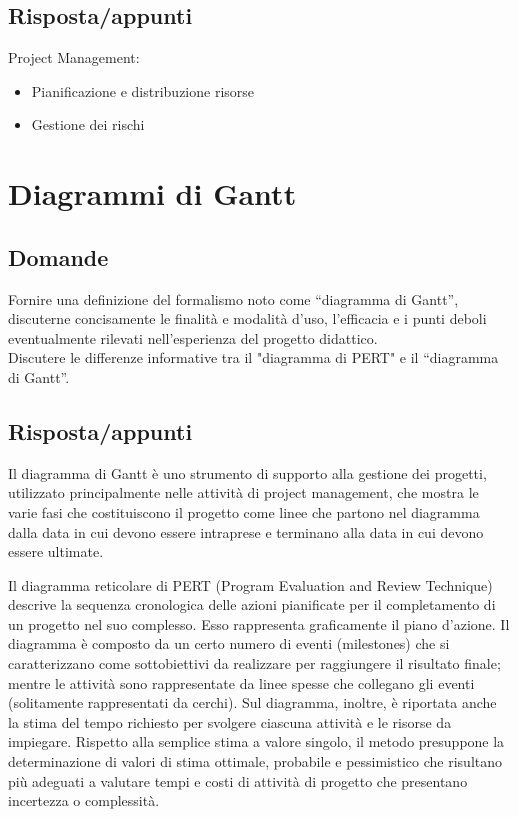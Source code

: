 \subsection*{Risposta/appunti}
Project Management:
\begin{itemize}
\item Pianificazione e distribuzione risorse
\item Gestione dei rischi    
\end{itemize}

\section{Diagrammi di Gantt}

\subsection*{Domande}
Fornire una definizione del formalismo noto come “diagramma di Gantt”, discuterne concisamente le finalità e modalità d'uso, l'efficacia e i punti deboli eventualmente rilevati nell'esperienza del progetto didattico.\\

Discutere le differenze informative tra il "diagramma di PERT" e il “diagramma di Gantt”.

\subsection*{Risposta/appunti}

Il diagramma di Gantt è uno strumento di supporto alla gestione dei progetti, utilizzato principalmente nelle attività di project management, che mostra le varie fasi che costituiscono il progetto come linee che partono nel diagramma dalla data in cui devono essere intraprese e terminano alla data in cui devono essere ultimate.

Il diagramma reticolare di PERT (Program Evaluation and Review Technique) descrive la sequenza cronologica delle azioni pianificate per il completamento di un progetto nel suo complesso. Esso rappresenta graficamente il piano d’azione. 
Il diagramma è composto da un certo numero di eventi (milestones) che si caratterizzano come sottobiettivi da realizzare per raggiungere il risultato finale; mentre le attività sono rappresentate da linee spesse che collegano gli eventi (solitamente rappresentati da cerchi). Sul diagramma, inoltre, è riportata anche la stima del tempo richiesto per svolgere ciascuna attività e le risorse da impiegare.
Rispetto alla semplice stima a valore singolo, il metodo presuppone la determinazione di valori di stima ottimale, probabile e pessimistico che risultano più adeguati a valutare tempi e costi di attività di progetto che presentano incertezza o complessità.


